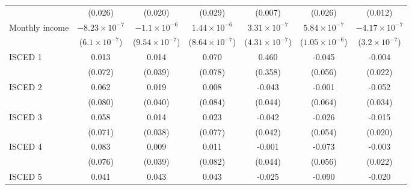 \begin{table}[htbp]
\begin{tabular}{lcccccc}
                                        & (0.026)                & (0.020)                 & (0.029)                 & (0.007)                 & (0.026)                 & (0.012)\\   
      Monthly income                    & $-8.23\times 10^{-7}$  & $-1.1\times 10^{-6}$    & $1.44\times 10^{-6}$    & $3.31\times 10^{-7}$    & $5.84\times 10^{-7}$    & $-4.17\times 10^{-7}$\\    
                                        & ($6.1\times 10^{-7}$)  & ($9.54\times 10^{-7}$)  & ($8.64\times 10^{-7}$)  & ($4.31\times 10^{-7}$)  & ($1.05\times 10^{-6}$)  & ($3.2\times 10^{-7}$)\\    
      ISCED 1                           & 0.013                  & 0.014                   & 0.070                   & 0.460                   & -0.045                  & -0.004\\   
                                        & (0.072)                & (0.039)                 & (0.078)                 & (0.358)                 & (0.056)                 & (0.022)\\   
      ISCED 2                           & 0.062                  & 0.019                   & 0.008                   & -0.043                  & -0.001                  & -0.052\\   
                                        & (0.080)                & (0.040)                 & (0.084)                 & (0.044)                 & (0.064)                 & (0.034)\\   
      ISCED 3                           & 0.058                  & 0.014                   & 0.023                   & -0.042                  & -0.026                  & -0.015\\   
                                        & (0.071)                & (0.038)                 & (0.077)                 & (0.042)                 & (0.054)                 & (0.020)\\   
      ISCED 4                           & 0.083                  & 0.009                   & 0.011                   & -0.001                  & -0.073                  & -0.003\\   
                                        & (0.076)                & (0.039)                 & (0.082)                 & (0.044)                 & (0.056)                 & (0.022)\\   
      ISCED 5                           & 0.041                  & 0.043                   & 0.043                   & -0.025                  & -0.090                  & -0.020\\   

\end{tabular}
\end{table}
